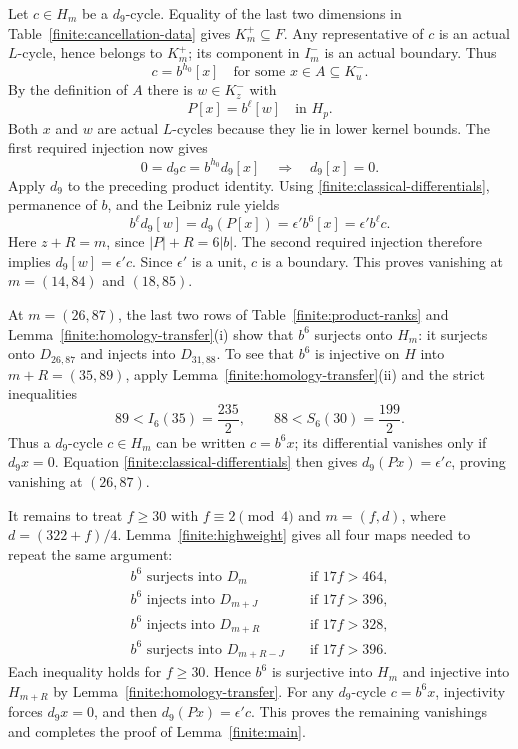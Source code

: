 Let $c\in H_m$ be a $d_9$-cycle.  Equality of the last two
dimensions in Table~\ref{finite:cancellation-data} gives
$K^+_m\subseteq F$.  Any representative of $c$ is an actual
$L$-cycle, hence belongs to $K^+_m$; its component in $I^-_m$ is
an actual boundary.  Thus
\[
 c=b^{h_0}[x]\quad\text{for some }x\in A\subseteq K^-_u.
\]
By the definition of $A$ there is $w\in K^-_z$ with
\[
 P[x]=b^\ell[w]\quad\text{in }H_p.
\]
Both $x$ and $w$ are actual $L$-cycles because they lie in lower
kernel bounds.  The first required injection now gives
\[
 0=d_9c=b^{h_0}d_9[x]\quad\Longrightarrow\quad d_9[x]=0.
\]
Apply $d_9$ to the preceding product identity.  Using
\eqref{finite:classical-differentials}, permanence of $b$, and the
Leibniz rule yields
\[
 b^\ell d_9[w]=d_9(P[x])=\epsilon'b^6[x]
                         =\epsilon'b^\ell c.
\]
Here $z+R=m$, since $|P|+R=6|b|$.
The second required injection therefore implies
$d_9[w]=\epsilon'c$.  Since $\epsilon'$ is a unit, $c$ is a
boundary.  This proves vanishing at $m=(14,84)$ and $(18,85)$.

At $m=(26,87)$, the last two rows of
Table~\ref{finite:product-ranks} and
Lemma~\ref{finite:homology-transfer}\textup{(i)} show that $b^6$
surjects onto $H_m$: it surjects onto $D_{26,87}$ and injects into
$D_{31,88}$.  To see that $b^6$ is injective on $H$ into
$m+R=(35,89)$, apply
Lemma~\ref{finite:homology-transfer}\textup{(ii)} and the strict
inequalities
\[
 89<I_6(35)=\frac{235}{2},\qquad
 88<S_6(30)=\frac{199}{2}.
\]
Thus a $d_9$-cycle $c\in H_m$ can be written $c=b^6x$; its
differential vanishes only if $d_9x=0$.  Equation
\eqref{finite:classical-differentials} then gives
$d_9(Px)=\epsilon'c$, proving vanishing at $(26,87)$.

It remains to treat $f\geq30$ with $f\equiv2\pmod4$ and
$m=(f,d)$, where $d=(322+f)/4$.  Lemma~\ref{finite:highweight}
gives all four maps needed to repeat the same argument:
\begin{align*}
 b^6\text{ surjects into }D_m
   &\quad\text{if }17f>464,\\
 b^6\text{ injects into }D_{m+J}
   &\quad\text{if }17f>396,\\
 b^6\text{ injects into }D_{m+R}
   &\quad\text{if }17f>328,\\
 b^6\text{ surjects into }D_{m+R-J}
   &\quad\text{if }17f>396.
\end{align*}
Each inequality holds for $f\geq30$.  Hence $b^6$ is surjective
into $H_m$ and injective into $H_{m+R}$ by
Lemma~\ref{finite:homology-transfer}.  For any $d_9$-cycle
$c=b^6x$, injectivity forces $d_9x=0$, and then
$d_9(Px)=\epsilon'c$.  This proves the remaining vanishings and
completes the proof of Lemma~\ref{finite:main}.
